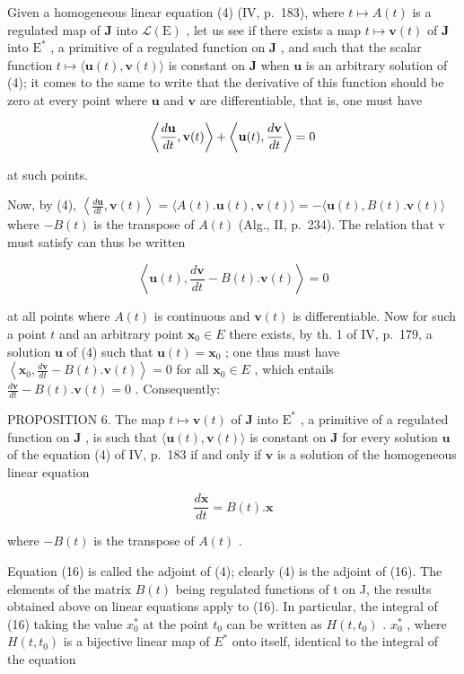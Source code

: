 Given a homogeneous linear equation (4) (IV, p.~183), where \(t \mapsto A(t)\) is a regulated map of \(\mathbf{J}\) into \(\mathcal{L}(\mathrm{E})\) , let us see if there exists a map \(t \mapsto \mathbf{v}(t)\) of \(\mathbf{J}\) into \(\mathrm{E}^*\) , a primitive of a regulated function on \(\mathbf{J}\) , and such that the scalar function \(t \mapsto \langle \mathbf{u}(t), \mathbf{v}(t) \rangle\) is constant on \(\mathbf{J}\) when \(\mathbf{u}\) is an arbitrary solution of (4); it comes to the same to write that the derivative of this function should be zero at every point where \(\mathbf{u}\) and \(\mathbf{v}\) are differentiable, that is, one must have

\[
\left\langle \frac {d {\bf u}}{d t}, {\bf v} (t) \right\rangle + \left\langle {\bf u} (t), \frac {d {\bf v}}{d t} \right\rangle = 0
\]

at such points.

Now, by (4), \(\left\langle\frac{d\mathbf{u}}{dt},\mathbf{v}(t)\right\rangle=\langle A(t).\mathbf{u}(t),\mathbf{v}(t)\rangle=-\langle\mathbf{u}(t),B(t).\mathbf{v}(t)\rangle\) where \(-B(t)\) is the transpose of \(A(t)\) (Alg., II, p.~234). The relation that v must satisfy can thus be written

\[
\left\langle \mathbf {u} (t), \frac {d \mathbf {v}}{d t} - B (t). \mathbf {v} (t) \right\rangle = 0
\]

at all points where \(A(t)\) is continuous and \(\mathbf{v}(t)\) is differentiable. Now for such a point \(t\) and an arbitrary point \(\mathbf{x}_0 \in E\) there exists, by th. 1 of IV, p.~179, a solution \(\mathbf{u}\) of (4) such that \(\mathbf{u}(t) = \mathbf{x}_0\) ; one thus must have \(\left\langle \mathbf{x}_0, \frac{d\mathbf{v}}{dt} - B(t).\mathbf{v}(t) \right\rangle = 0\) for all \(\mathbf{x}_0 \in E\) , which entails \(\frac{d\mathbf{v}}{dt} - B(t).\mathbf{v}(t) = 0\) . Consequently:

PROPOSITION 6. The map \(t \mapsto \mathbf{v}(t)\) of \(\mathbf{J}\) into \(\mathrm{E}^*\) , a primitive of a regulated function on \(\mathbf{J}\) , is such that \(\langle \mathbf{u}(t), \mathbf{v}(t) \rangle\) is constant on \(\mathbf{J}\) for every solution \(\mathbf{u}\) of the equation (4) of IV, p.~183 if and only if \(\mathbf{v}\) is a solution of the homogeneous linear equation

\[
{\frac {d \mathbf {x}}{d t}} = B (t). \mathbf {x}\tag{16}
\]

where \(-B(t)\) is the transpose of \(A(t)\) .

Equation (16) is called the adjoint of (4); clearly (4) is the adjoint of (16). The elements of the matrix \(B(t)\) being regulated functions of t on J, the results obtained above on linear equations apply to (16). In particular, the integral of (16) taking the value \(x_{0}^{*}\) at the point \(t_{0}\) can be written as \(H(t, t_{0})\) . \(x_{0}^{*}\) , where \(H(t, t_{0})\) is a bijective linear map of \(E^{*}\) onto itself, identical to the integral of the equation

